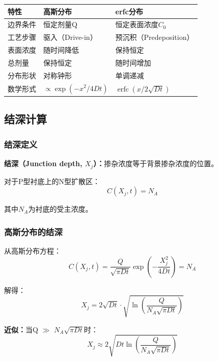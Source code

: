 \documentclass[UTF8,12pt,a4paper]{ctexart}
\begin{document}
\begin{table}[h]
\centering
\begin{tabular}{|l|l|l|}
\hline
\textbf{特性} & \textbf{高斯分布} & \textbf{erfc分布} \\
\hline
边界条件 & 恒定剂量Q & 恒定表面浓度$C_0$ \\
\hline
工艺步骤 & 驱入（Drive-in） & 预沉积（Predeposition） \\
\hline
表面浓度 & 随时间降低 & 保持恒定 \\
\hline
总剂量 & 保持恒定 & 随时间增加 \\
\hline
分布形状 & 对称钟形 & 单调递减 \\
\hline
数学形式 & $\propto \exp(-x^2/4Dt)$ & $\operatorname{erfc}(x/2\sqrt{Dt})$ \\
\hline
\end{tabular}
\end{table}

\subsection{结深计算}

\subsubsection{结深定义}

\textbf{结深（Junction depth, $X_j$）：}掺杂浓度等于背景掺杂浓度的位置。

对于P型衬底上的N型扩散区：
\begin{equation}
C(X_j, t) = N_A
\end{equation}

其中$N_A$为衬底的受主浓度。

\subsubsection{高斯分布的结深}

从高斯分布方程：
\begin{equation}
C(X_j,t) = \frac{Q}{\sqrt{\pi Dt}} \exp\left(-\frac{X_j^2}{4Dt}\right) = N_A
\end{equation}

解得：
\begin{equation}
X_j = 2\sqrt{Dt} \cdot \sqrt{\ln\left(\frac{Q}{N_A\sqrt{\pi Dt}}\right)}
\end{equation}

\textbf{近似：}当Q $\gg$ $N_A\sqrt{\pi Dt}$时：
\begin{equation}
X_j \approx 2\sqrt{Dt \ln\left(\frac{Q}{N_A\sqrt{\pi Dt}}\right)}
\end{equation}
\end{document}
